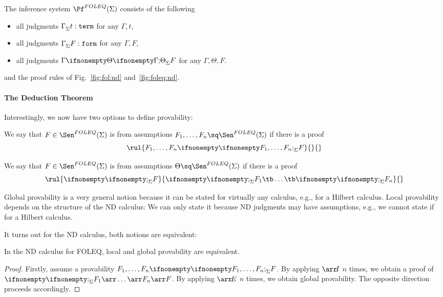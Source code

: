 \begin{definition}\label{def:fol:pf}
The inference system $\Pf^{FOLEQ}(\Sigma)$ consists of the following 
\begin{itemize}
 \item all judgments $\Gamma^{}_{\Sigma}t:\mathtt{term}$ for any $\Gamma,t$,
 \item all judgments $\Gamma^{}_{\Sigma}F:\mathtt{form}$ for any $\Gamma,F$,
 \item all judgments $\iscons{\Sigma}{\Gamma}{\Theta}{F}$ for any $\Gamma,\Theta,F$.
\end{itemize}
and the proof rules of Fig.~\ref{fig:fol:nd} and~\ref{fig:foleq:nd}.
\end{definition}

\paragraph{The Deduction Theorem}
Interestingly, we now have two options to define provability:

\begin{definition}
We say that $F\in\Sen^{FOLEQ}(\Sigma)$ is  from assumptions $F_1,\ldots,F_n\sq\Sen^{FOLEQ}(\Sigma)$ if there is a proof \[\rul{\iscons{\Sigma}{F_1,\ldots,F_n}{}{F}}{}{}\]

We say that $F\in\Sen^{FOLEQ}(\Sigma)$ is  from assumptions $\Theta\sq\Sen^{FOLEQ}(\Sigma)$ if there is a proof \[\rul{\iscons{\Sigma}{}{}{F}}{\iscons{\Sigma}{}{}{F_1\tb\ldots\tb\iscons{\Sigma}{}{}{F_n}}}{}\]
\end{definition}

Global provability is a very general notion because it can be stated for virtually any calculus, e.g., for a Hilbert calculus. Local provability depends on the structure of the ND calculus: We can only state it because ND judgments may have assumptions, e.g., we cannot state if for a Hilbert calculus.

It turns out for the ND calculus, both notions are equivalent:

\begin{theorem}
In the ND calculus for FOLEQ, local and global provability are equivalent.
\end{theorem}
\begin{proof}
Firstly, assume a provability $\iscons{\Sigma}{F_1,\ldots,F_n}{}{F}$. By applying $\arr\! I$ $n$ times, we obtain a proof of $\iscons{\Sigma}{}{}{F_1\arr\ldots\arr F_n\arr F}$. By applying $\arr\! E$ $n$ times, we obtain global provability.
The opposite direction proceeds accordingly.
\end{proof}

